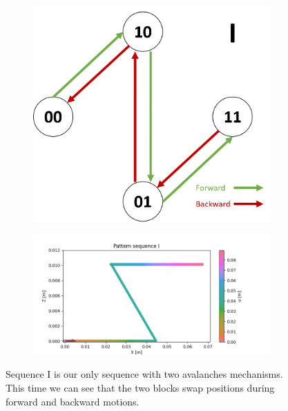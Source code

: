         \begin{figure}[h]
            \centering
            \begin{subfigure}{.2\textwidth}
            \includegraphics[width=\textwidth]{images/S_I.png}
            \end{subfigure}%
            \begin{subfigure}{.6\textwidth}
            \includegraphics[width=\textwidth]{images/I.png}
            \end{subfigure}
            \caption{Sequence I is our only sequence with two avalanches mechanisms. This time we can see that the two blocks swap positions during forward and backward motions.}
        \end{figure} 
        
